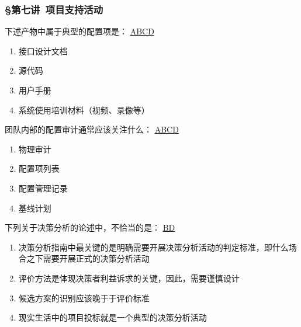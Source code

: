 \subsubsection*{\S 第七讲\ 项目支持活动}
\setcounter{problemname}{0}

\begin{problem}
	下述产物中属于典型的配置项是：
	\uline{ABCD}    
    \vspace{-0.8em}
    \begin{multicols}{2}
        \begin{enumerate}[label=\Alph*.]
            \item 接口设计文档
            \item 源代码
            \item 用户手册
            \item 系统使用培训材料（视频、录像等）
        \end{enumerate}
    \end{multicols}
    \vspace{-1em}
\end{problem}



\begin{problem}
	团队内部的配置审计通常应该关注什么：
	\uline{ABCD}    
    \vspace{-0.8em}
    \begin{multicols}{4}
        \begin{enumerate}[label=\Alph*.]
            \item 物理审计
            \item 配置项列表
            \item 配置管理记录
            \item 基线计划
        \end{enumerate}
    \end{multicols}
    \vspace{-1em}
\end{problem}



\begin{problem}
	下列关于决策分析的论述中，不恰当的是：
	\uline{BD}    
        \begin{enumerate}[label=\Alph*.]
            \item 决策分析指南中最关键的是明确需要开展决策分析活动的判定标准，即什么场合之下需要开展正式的决策分析活动
            \item 评价方法是体现决策者利益诉求的关键，因此，需要谨慎设计
            \item 候选方案的识别应该晚于于评价标准
            \item 现实生活中的项目投标就是一个典型的决策分析活动
        \end{enumerate}
\end{problem}




